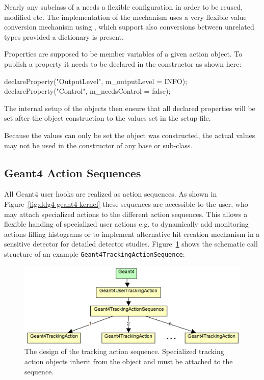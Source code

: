 \documentclass[10pt,a4paper]{article}
\begin{document}
\noindent
Nearly any subclass of a  needs a flexible configuration 
in order to be reused, modified etc. The implementation of the mechanism
uses a very flexible value conversion mechanism using ,
which support also conversions between unrelated types provided a dictionary 
is present.

\noindent
Properties are supposed to be member variables of a given action object.
To publish a property it needs to be declared in the constructor as shown here:
\begin{unnumberedcode}
  declareProperty("OutputLevel", m_outputLevel = INFO);
  declareProperty("Control",     m_needsControl = false);
\end{unnumberedcode}
The internal setup of the  objects then ensure that 
all declared properties will be set after the object construction to the 
values set in the setup file.

\noindent
{} Because the values can only be set  the object 
was constructed, the actual values may not be used in the constructor
of any base or sub-class.

\subsection{Geant4 Action Sequences}
\label{sec:ddg4-user-manual-implementation-geant4action-sequences}

\noindent
All Geant4 user hooks are realized as action sequences. As shown in 
Figure~\ref{fig:ddg4-geant4-kernel} these sequences are accessible to the user,
who may attach specialized actions to the different action sequences. This 
allows a flexible handing of specialized user actions e.g. to dynamically
add monitoring actions filling histograms or to implement alternative hit 
creation mechanism in a sensitive detector for detailed detector studies.
Figure~\ref{fig:ddg4-implementation-sequence-calls} shows the schematic
call structure of an example {\tt{Geant4TrackingActionSequence}}:\\
\begin{figure}[h]
  \begin{center}
    \includegraphics[width=150mm] {DDG4-TrackingActionCalls.png}
    \caption{The design of the tracking action sequence. Specialized 
               tracking action objects inherit from the 
               object and must be attached to the sequence.}
    \label{fig:ddg4-implementation-sequence-calls}
  \end{center}
\end{figure}
\end{document}
